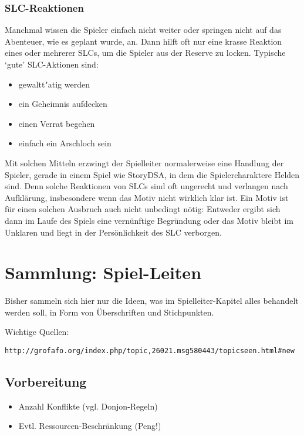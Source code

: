 \subsection{SLC-Reaktionen}
Manchmal wissen die Spieler einfach nicht weiter oder springen nicht auf das Abenteuer, wie es geplant wurde, an. Dann hilft oft nur eine krasse Reaktion eines oder mehrerer SLCs, um die Spieler aus der Reserve zu locken. Typische `gute' SLC-Aktionen sind:
\begin{itemize}
  \item gewaltt"atig werden
  \item ein Geheimnis aufdecken
  \item einen Verrat begehen
  \item einfach ein Arschloch sein
\end{itemize}

Mit solchen Mitteln erzwingt der Spielleiter normalerweise eine Handlung der Spieler, gerade in einem Spiel wie StoryDSA, in dem die Spielercharaktere Helden sind. Denn solche Reaktionen von SLCs sind oft ungerecht und verlangen nach Aufklärung, insbesondere wenn das Motiv nicht wirklich klar ist. Ein Motiv ist für einen solchen Ausbruch auch nicht unbedingt nötig: Entweder ergibt sich dann im Laufe des Spiels eine vernünftige Begründung oder das Motiv bleibt im Unklaren und liegt in der Persönlichkeit des SLC verborgen.


\chapter{Sammlung: Spiel-Leiten}
Bisher sammeln sich hier nur die Ideen, was im Spielleiter-Kapitel alles behandelt werden soll, in Form von Überschriften und Stichpunkten.

Wichtige Quellen:

\verb;http://grofafo.org/index.php/topic,26021.msg580443/topicseen.html#new;

\section{Vorbereitung}
\begin{itemize}
  \item Anzahl Konflikte (vgl. Donjon-Regeln)
  \item Evtl. Ressourcen-Beschränkung (Peng!)
\end{itemize}
